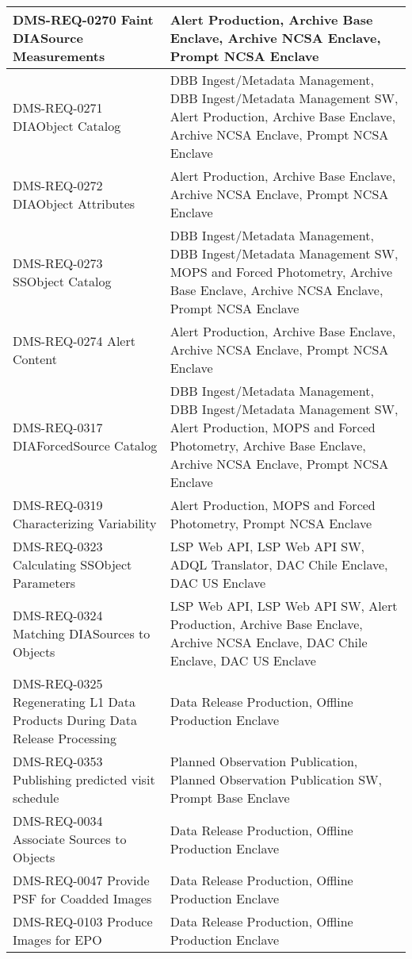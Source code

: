 \begin{longtable}{p{}p{}}
DMS-REQ-0270 Faint DIASource Measurements & Alert Production, Archive Base Enclave, Archive NCSA Enclave, Prompt NCSA Enclave \\ \hline
DMS-REQ-0271 DIAObject Catalog & DBB Ingest/Metadata Management, DBB Ingest/Metadata Management SW, Alert Production, Archive Base Enclave, Archive NCSA Enclave, Prompt NCSA Enclave \\ \hline
DMS-REQ-0272 DIAObject Attributes & Alert Production, Archive Base Enclave, Archive NCSA Enclave, Prompt NCSA Enclave \\ \hline
DMS-REQ-0273 SSObject Catalog & DBB Ingest/Metadata Management, DBB Ingest/Metadata Management SW, MOPS and Forced Photometry, Archive Base Enclave, Archive NCSA Enclave, Prompt NCSA Enclave \\ \hline
DMS-REQ-0274 Alert Content & Alert Production, Archive Base Enclave, Archive NCSA Enclave, Prompt NCSA Enclave \\ \hline
DMS-REQ-0317 DIAForcedSource Catalog & DBB Ingest/Metadata Management, DBB Ingest/Metadata Management SW, Alert Production, MOPS and Forced Photometry, Archive Base Enclave, Archive NCSA Enclave, Prompt NCSA Enclave \\ \hline
DMS-REQ-0319 Characterizing Variability & Alert Production, MOPS and Forced Photometry, Prompt NCSA Enclave \\ \hline
DMS-REQ-0323 Calculating SSObject Parameters & LSP Web API, LSP Web API SW, ADQL Translator, DAC Chile Enclave, DAC US Enclave \\ \hline
DMS-REQ-0324 Matching DIASources to Objects & LSP Web API, LSP Web API SW, Alert Production, Archive Base Enclave, Archive NCSA Enclave, DAC Chile Enclave, DAC US Enclave \\ \hline
DMS-REQ-0325 Regenerating L1 Data Products During Data Release Processing & Data Release Production, Offline Production Enclave \\ \hline
DMS-REQ-0353 Publishing predicted visit schedule & Planned Observation Publication, Planned Observation Publication SW, Prompt Base Enclave \\ \hline
DMS-REQ-0034 Associate Sources to Objects & Data Release Production, Offline Production Enclave \\ \hline
DMS-REQ-0047 Provide PSF for Coadded Images & Data Release Production, Offline Production Enclave \\ \hline
DMS-REQ-0103 Produce Images for EPO & Data Release Production, Offline Production Enclave \\ \hline

\end{longtable}
